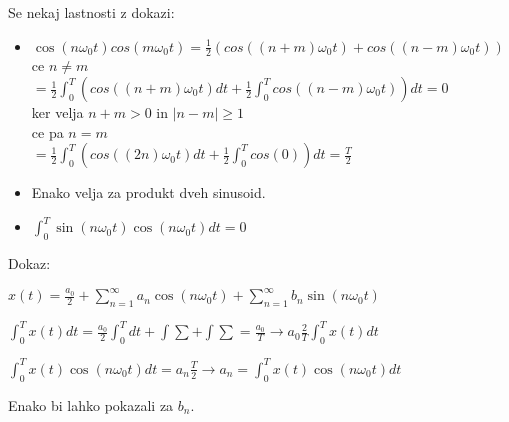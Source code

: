 \documentclass{article}
\begin{document}
\begin{multicols}{2}
	Se nekaj lastnosti z dokazi:
	\begin{itemize}
		\item
		      \begin{center}
			      \begin{math}
				      \cos(n \omega_0 t) cos(m \omega_0 t) = \frac{1}{2} (cos((n+m)\omega_0 t) + cos((n-m) \omega_0 t))
			      \end{math} \\
			      ce $n \neq m$ \\
			      \begin{math}
				      = \frac{1}{2} \int_0^T (cos((n+m)\omega_0 t)dt + \frac{1}{2} \int_0^T cos((n-m) \omega_0 t))dt = 0
			      \end{math} \\
			      ker velja $n + m > 0$  in $|n - m| \geq 1$ \\
			      ce pa $n = m$ \\
			      \begin{math}
				      = \frac{1}{2} \int_0^T (cos((2n)\omega_0 t)dt + \frac{1}{2} \int_0^T cos(0))dt = \frac{T}{2}
			      \end{math} \\
		      \end{center}
		\item
		      \begin{center}
			      Enako velja za produkt dveh sinusoid.
		      \end{center}
		\item
		      \begin{center}
			      \begin{math}
				      \int_0^T \sin(n \omega_0 t) \cos(n \omega_0 t) dt = 0
			      \end{math}
		      \end{center}
	\end{itemize}

	Dokaz:
	\begin{center}
		\begin{math}
			x(t) = \frac{a_0}{2} + \sum_{n = 1}^{\infty} a_n \cos(n \omega_0 t) +
			\sum_{n = 1}^{\infty} b_n \sin(n \omega_0 t)
		\end{math}
	\end{center}
	\begin{center}
		\begin{math}
			\int_0^T x(t) dt = \frac{a_0}{2} \int_0^T dt + \int \sum + \int \sum = \frac{a_0} T \rightarrow a_0 \frac{2}{T} \int_0^T x(t) dt
		\end{math}
	\end{center}
	\begin{center}
		\begin{math}
			\int_0^T x(t) \cos(n \omega_0 t) dt = a_n \frac{T}{2} \rightarrow a_n = \int_0^T x(t) \cos (n \omega_0 t) dt
		\end{math}
	\end{center}
	Enako bi lahko pokazali za $b_n$.


\end{multicols}
\end{document}
